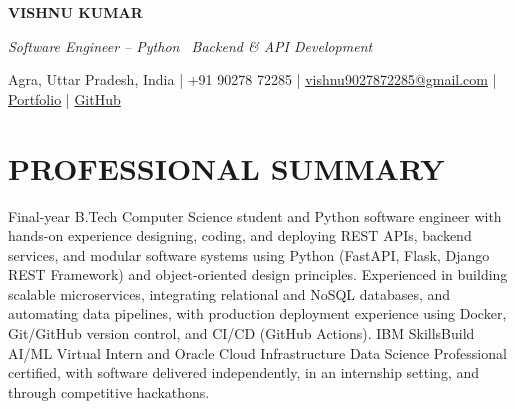 \documentclass[10pt,letterpaper]{article}
\begin{document}

\begin{center}

{\bfseries\fontsize{19}{20}\selectfont
VISHNU KUMAR
}

\vspace{1.5pt}

{\itshape\fontsize{10.5}{11.5}\selectfont
Software Engineer -- Python \textbar\ Backend \& API Development
}

\vspace{1.5pt}

{\fontsize{9.3}{10.3}\selectfont
Agra, Uttar Pradesh, India
\;|\;
+91 90278 72285
\;|\;
\href{mailto:vishnu9027872285@gmail.com}
{vishnu9027872285@gmail.com}
\;|\;
\href{https://vishnukumar.pro}
{\textcolor{linkblue}{Portfolio}}
\;|\;
\href{https://github.com/HelloVishnu04}
{\textcolor{linkblue}{GitHub}}
}

\end{center}


\section*{PROFESSIONAL SUMMARY}

\begin{justify}
{\fontsize{9}{10.3}\selectfont
Final-year B.Tech Computer Science student and Python software engineer with
hands-on experience designing, coding, and deploying REST APIs, backend
services, and modular software systems using Python (FastAPI, Flask, Django
REST Framework) and object-oriented design principles. Experienced in
building scalable microservices, integrating relational and NoSQL databases,
and automating data pipelines, with production deployment experience using
Docker, Git/GitHub version control, and CI/CD (GitHub Actions). IBM
SkillsBuild AI/ML Virtual Intern and Oracle Cloud Infrastructure Data Science
Professional certified, with software delivered independently, in an
internship setting, and through competitive hackathons.
}
\end{justify}

\end{document}
